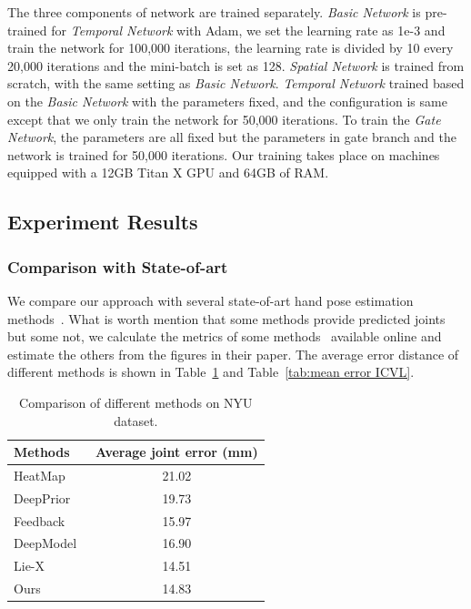 \documentclass[journal,comsoc]{IEEEtran}
\let\MYoriglatexcaption\caption
\renewcommand{\caption}[2][\relax]{\MYoriglatexcaption[#2]{#2}}
\begin{document}
The three components of network are trained separately. \emph{Basic Network} is pre-trained for
\emph{Temporal Network} with Adam, we set the learning rate as 1e-3
and train the network for 100,000 iterations, the learning rate is divided by 10 every 20,000
iterations and the mini-batch is set as 128. \emph{Spatial Network} is trained from scratch,
with the same setting as \emph{Basic Network}. \emph{Temporal Network} trained based on the \emph{Basic Network}
with the parameters fixed, and the configuration is same except that we only train the
network for 50,000 iterations.  To train the \emph{Gate Network}, the parameters are all fixed
but the parameters in gate branch and the network is trained for 50,000 iterations. Our training
takes place on machines equipped with a 12GB Titan X GPU and 64GB of RAM.

\subsection{Experiment Results}\label{sec:experiment results}
\subsubsection{Comparison with State-of-art}\label{sec:comparison}
We compare our approach with several state-of-art hand pose estimation methods~\cite{tompson2014real,oberweger2015hands, 
oberweger2015training, zhou2016model,tang2014latent,ge2017_3D,sinha2016deephand}. What is worth mention that some methods 
provide predicted joints but some not, we calculate the metrics of some methods~\cite{tompson2014real, oberweger2015hands,
oberweger2015training,zhou2016model,tang2014latent} available online and estimate the others from the figures in their paper. 
The average error distance of different methods is shown in Table~\ref{tab:mean error NYU} and Table~\ref{tab:mean error ICVL}.
\begin{table}[htbp]
  \centering
  \caption{Comparison of different methods on NYU dataset.}
    \begin{tabular}{|l|c|}
    \hline
    Methods & \multicolumn{1}{l}{Average joint error (mm)} \\
    \hline
    HeatMap~\cite{tompson2014real} & 21.02 \\
    DeepPrior~\cite{oberweger2015hands} & 19.73 \\
    Feedback~\cite{oberweger2015training} & 15.97 \\
    DeepModel~\cite{zhou2016model} & 16.90 \\
    Lie-X~\cite{xu2017lie} & 14.51 \\
    Ours  & 14.83 \\
    \hline
    \end{tabular}%
  \label{tab:mean error NYU}%
\end{table}%
\end{document}
